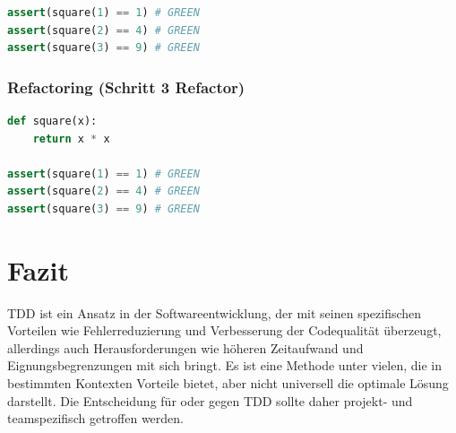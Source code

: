 \documentclass[a0,landscape]{a0poster}
\newcommand{\gqq}[1]{\glqq #1\grqq}
\begin{document}
\begin{multicols}{4}
\begin{lstlisting}[language=Python]
assert(square(1) == 1) # GREEN
assert(square(2) == 4) # GREEN
assert(square(3) == 9) # GREEN
\end{lstlisting}

\subsubsection*{Refactoring (Schritt 3 \gqq{Refactor})}
\begin{lstlisting}[language=Python]
def square(x):
    return x * x

assert(square(1) == 1) # GREEN
assert(square(2) == 4) # GREEN
assert(square(3) == 9) # GREEN
\end{lstlisting}

\color{SaddleBrown}
\section*{Fazit}
TDD ist ein Ansatz in der Softwareentwicklung, der mit seinen spezifischen Vorteilen wie Fehlerreduzierung und Verbesserung der Codequalität überzeugt, allerdings auch Herausforderungen wie höheren Zeitaufwand und Eignungsbegrenzungen mit sich bringt. Es ist eine Methode unter vielen, die in bestimmten Kontexten Vorteile bietet, aber nicht universell die optimale Lösung darstellt. Die Entscheidung für oder gegen TDD sollte daher projekt- und teamspezifisch getroffen werden.

\color{DarkSlateGray}


\nocite{*} %



\end{multicols}
\end{document}
